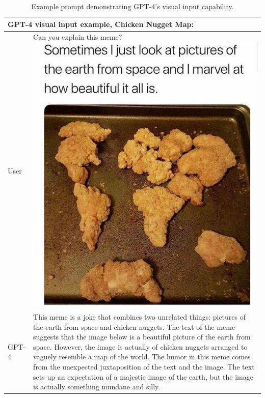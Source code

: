 \documentclass{article}
\begin{document}
\begin{table}
\begin{tabular}[]{p{0.5in}p{4.5in}}
\toprule
\multicolumn{2}{p{5in}}{
\textbf{GPT-4 visual input example, Chicken Nugget Map}:}\\
\midrule
User & Can you explain this meme?\newline\newline
\includegraphics[width=0.8\linewidth]{assets/nuggets.png}\newline
\\
GPT-4 & This meme is a joke that combines two unrelated things: pictures of the earth from space and chicken nuggets.\newline
The text of the meme suggests that the image below is a beautiful picture of the earth from space. However, the image is actually of chicken nuggets arranged to vaguely resemble a map of the world.\newline
The humor in this meme comes from the unexpected juxtaposition of the text and the image. The text sets up an expectation of a majestic image of the earth, but the image is actually something mundane and silly.\\
\bottomrule
\end{tabular}
\caption{Example prompt demonstrating GPT-4's visual input capability.}
\label{table:visual_input_chicken}
\end{table}
\end{document}
